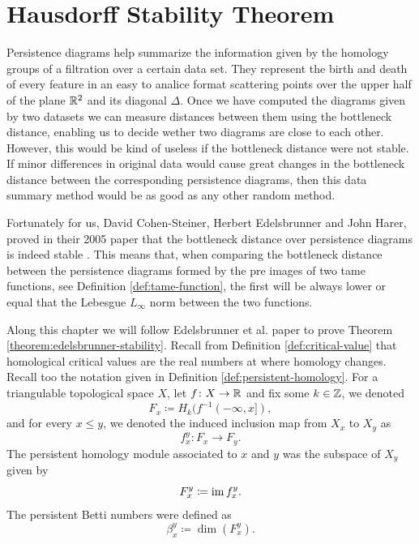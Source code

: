 \chapter{Hausdorff Stability Theorem} \label{chap:hausdorff-stability}

Persistence diagrams help summarize the information given by the homology groups of a filtration over a certain data set. They represent the birth and death of every feature in an easy to analice format scattering points over the upper half of the plane $\mathbb R^2 $ and its diagonal $ \Delta $. Once we have computed the diagrams given by two datasets we can measure distances between them using the bottleneck distance, enabling us to decide wether two diagrams are close to each other. However, this would be kind of useless if the bottleneck distance were not stable. If minor differences in original data would cause great changes in the bottleneck distance between the corresponding persistence diagrams, then this data summary method would be as good as any other random method.

Fortunately for us, David Cohen-Steiner, Herbert Edelsbrunner and John Harer, proved in their 2005 paper that the bottleneck distance over persistence diagrams is indeed stable \cite{Edelsbrunner}. This means that, when comparing the bottleneck distance between the persistence diagrams formed by the pre images of two tame functions, see Definition \ref{def:tame-function}, the first will be always lower or equal that the Lebesgue $L_\infty$ norm between the two functions.

Along this chapter we will follow Edelsbrunner et al. paper \cite{Edelsbrunner} to prove Theorem \ref{theorem:edelsbrunner-stability}. Recall from Definition \ref{def:critical-value} that homological critical values are the real numbers at where homology changes. Recall too the notation given in Definition \ref{def:persistent-homology}. For a triangulable topological space $X$, let $ f \colon X \to \mathbb R $ and fix some $ k \in \mathbb Z $, we denoted
\begin{equation}
    F_x \coloneq H_k(f^{-1}(-\infty, x]),
\end{equation}
and for every $ x \leq y $, we denoted the induced inclusion map from $ X_x $ to $ X_y $ as
\begin{equation}
    f_x^y \colon F_x \to F_y.
\end{equation}
The persistent homology module associated to $ x $ and $ y $ was the subspace of $X_y$ given by 
\begin{equation}
    F_x^y \coloneq \operatorname{im} f_x^y.
\end{equation}
The persistent Betti numbers were defined as
\begin{equation}
    \beta_x^y \coloneq \dim(F_x^y).
\end{equation}

